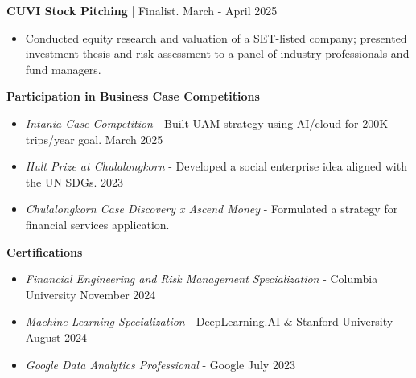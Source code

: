 \documentclass[a4paper, 11pt]{article}
\begin{document}

\textbf{CUVI Stock Pitching} | Finalist. \hfill March - April 2025
\begin{itemize}[noitemsep, topsep=0pt, partopsep=0pt, parsep=0pt]
    \item Conducted equity research and valuation of a SET-listed company; presented investment thesis and risk assessment to a panel of industry professionals and fund managers.
\end{itemize}
\vspace{3pt}

\textbf{Participation in Business Case Competitions}
\begin{itemize}[noitemsep, topsep=0pt, partopsep=0pt, parsep=0pt]
    \item \textit{Intania Case Competition} - Built UAM strategy using AI/cloud for 200K trips/year goal. \hfill March 2025
    \item \textit{Hult Prize at Chulalongkorn} - Developed a social enterprise idea aligned with the UN SDGs. \hfill 2023
    \item \textit{Chulalongkorn Case Discovery x Ascend Money} - Formulated a strategy for financial services application.
\end{itemize}
\vspace{3pt}

\textbf{Certifications}
\begin{itemize}[noitemsep, topsep=0pt, partopsep=0pt, parsep=0pt]
    \item \textit{Financial Engineering and Risk Management Specialization} - Columbia University \hfill November 2024
    \item \textit{Machine Learning Specialization} - DeepLearning.AI \& Stanford University \hfill August 2024
    \item \textit{Google Data Analytics Professional} - Google \hfill July 2023
\end{itemize}
\end{document}
